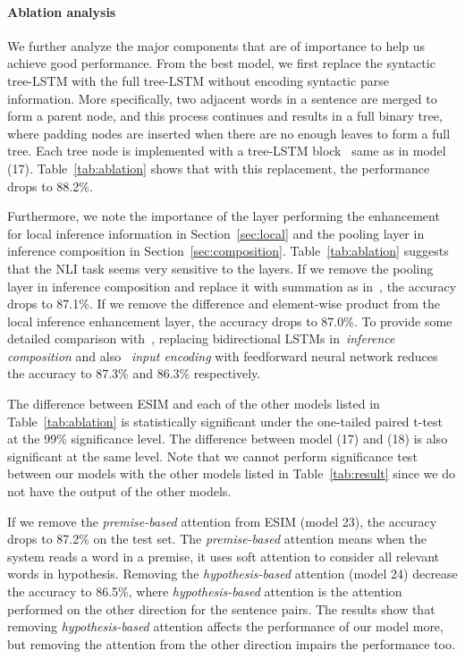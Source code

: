 \documentclass[11pt,a4paper]{article}
\begin{document}
\paragraph{Ablation analysis}
We further analyze the major components that are of importance to help us achieve good performance. From the best model, we first replace the syntactic tree-LSTM with the full tree-LSTM without encoding syntactic parse information. More specifically, two adjacent words in a sentence are merged to form a parent node, and
this process continues and results in a full binary tree, where padding nodes are inserted when there are no enough leaves to form a full tree. Each tree node is implemented with a tree-LSTM
block~\cite{DBLP:conf/icml/ZhuSG15} same as in model (17). Table~\ref{tab:ablation} shows that with this replacement, the performance drops to 88.2\%.

Furthermore, we note the importance of the layer performing the enhancement for local inference information in Section~\ref{sec:local} and the pooling layer in inference composition in Section~\ref{sec:composition}. Table~\ref{tab:ablation} suggests that the NLI task seems very sensitive to the layers. If we remove the pooling layer in inference composition and replace it with summation as in~\citet{Parikh:D16-1244}, the accuracy drops to 87.1\%. If we remove the difference and element-wise product from the local inference enhancement layer, the accuracy drops to 87.0\%. To provide some detailed comparison with~\citet{Parikh:D16-1244}, replacing bidirectional LSTMs in~\textit{inference composition} and also ~\textit{input encoding} with feedforward neural network reduces the accuracy to 87.3\% and 86.3\% respectively.  

The difference between ESIM and each of the other models listed in Table~\ref{tab:ablation} is statistically significant under the one-tailed paired t-test at the 99\% significance level. The difference between model (17) and (18) is also significant at the same level. Note that we cannot perform significance test between our models with the other models listed in Table~\ref{tab:result} since we do not have the output of the other models.

If we remove the \textit{premise-based} attention from ESIM (model 23), the accuracy drops to 87.2\% on the test set. The \textit{premise-based} attention means when the system reads a word in a premise, it uses soft attention to consider all relevant words in hypothesis. Removing the \textit{hypothesis-based} attention (model 24) decrease the accuracy to 86.5\%, where \textit{hypothesis-based} attention is the attention performed on the other direction for the sentence pairs. The results show that removing \textit{hypothesis-based} attention affects the performance of our model more, but removing the attention from the other direction impairs the performance too. 
\end{document}
